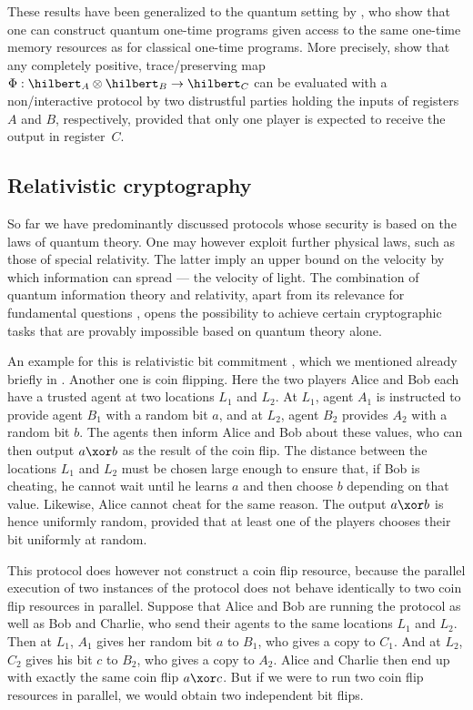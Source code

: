 These results have been generalized to the quantum setting by
\textcite{BGS13}, who show that one can construct quantum one-time
programs given access to the same one-time memory resources as for
classical one-time programs. More precisely, \textcite{BGS13} show
that any completely positive, trace\-/preserving map
$\Phi : \hilbert_A \otimes \hilbert_B \to \hilbert_C$ can be evaluated
with a non\-/interactive protocol by two distrustful parties holding
the inputs of registers $A$ and $B$, respectively, provided that only
one player is expected to receive the output in register~$C$.

\subsection{Relativistic cryptography}
\label{sec:relativistic}

So far we have predominantly discussed protocols whose security is based on the laws of quantum theory. One may however exploit further physical laws, such as those of special relativity. The latter imply an upper bound on the velocity by which information can spread --- the velocity of light. The combination of quantum information theory and relativity, apart from its relevance for fundamental questions \cite{Peres_Terno_RMP}, opens the possibility to achieve certain cryptographic tasks that are provably impossible based on quantum theory alone.

An example for this is relativistic bit commitment \cite{Ken99}, which
we mentioned already briefly in . Another one is
coin flipping. Here the two players Alice and Bob each have a trusted
agent at two locations $L_1$ and $L_2$. At $L_1$, agent $A_1$ is
instructed to provide agent $B_1$ with a random bit $a$, and at $L_2$,
agent $B_2$ provides $A_2$ with a random bit $b$. The agents then
inform Alice and Bob about these values, who can then output
$a \xor b$ as the result of the coin flip. The distance between the
locations $L_1$ and $L_2$ must be chosen large enough to ensure that,
if Bob is cheating, he cannot wait until he learns $a$ and then choose
$b$ depending on that value. Likewise, Alice cannot cheat for the same
reason. The output $a \xor b$ is hence uniformly random, provided that
at least one of the players chooses their bit uniformly at random.

This protocol does however not construct a coin flip resource, because
the parallel execution of two instances of the protocol does not
behave identically to two coin flip resources in parallel. Suppose
that Alice and Bob are running the protocol as well as Bob and
Charlie, who send their agents to the same locations $L_1$ and
$L_2$. Then at $L_1$, $A_1$ gives her random bit $a$ to $B_1$, who
gives a copy to $C_1$. And at $L_2$, $C_2$ gives his bit $c$ to $B_2$,
who gives a copy to $A_2$. Alice and Charlie then end up with exactly
the same coin flip $a \xor c$. But if we were to run two coin flip
resources in parallel, we would obtain two independent bit flips.


